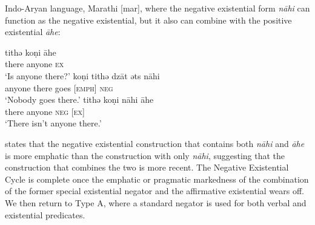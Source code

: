 ﻿\documentclass[output=paper]{langsci/langscibook}
\begin{document}
\begin{exe}
{Indo-Aryan language, Marathi [mar], where the negative existential form
\textit{nāhi} can function as the negative existential, but it also can
combine with the positive existential \textit{āhe}:
%
\begin{exe}\ex\label{ex:ieur-marathi-anyone}
\begin{xlist}
\ex
    \gll tithǝ  koṇi      āhe \\
there anyone \textsc{ex} \\
    \glt `Is anyone there?'
\ex
\gll koṇi      tithǝ  dzāt {\ob}ǝts{\cb}     nāhi\\
anyone there goes [\textsc{emph}] \textsc{neg}\\
\glt `Nobody goes there.'
\ex
\gll tithǝ  koṇi      nāhi {\ob}āhe{\cb}\\
there anyone \textsc{neg}  [\textsc{ex}]\\
\glt `There isn't anyone there.'
\end{xlist}\end{exe}
%
\citet[12]{Croft1991} states that the negative existential construction
that contains both \textit{nāhi} and \textit{āhe} is more emphatic than the
construction with only \textit{nāhi}, suggesting that the construction that
combines the two is more recent. The Negative Existential Cycle is complete
once the emphatic or pragmatic markedness of the combination of the former
special existential negator and the affirmative existential wears off. We
then return to Type A, where a standard negator is used for both verbal and
existential predicates.

}
\end{exe}
\end{document}
